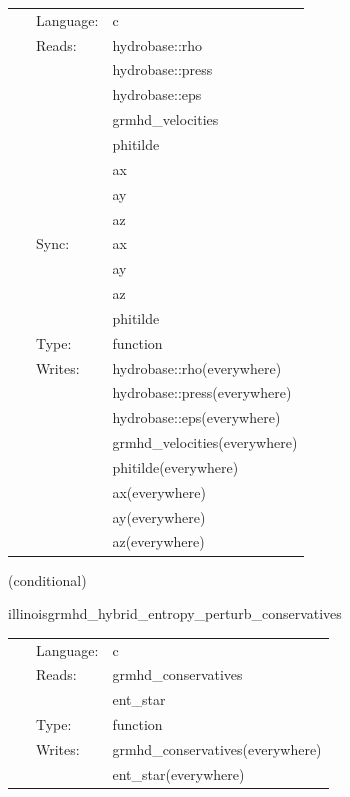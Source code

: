  \begin{tabular*}{160mm}{cll} 
~ & Language:  & c \\ 
~ & Reads:  & hydrobase::rho \\ 
~& ~ &hydrobase::press\\ 
~& ~ &hydrobase::eps\\ 
~& ~ &grmhd\_velocities\\ 
~& ~ &phitilde\\ 
~& ~ &ax\\ 
~& ~ &ay\\ 
~& ~ &az\\ 
~ & Sync:  & ax \\ 
~& ~ &ay\\ 
~& ~ &az\\ 
~& ~ &phitilde\\ 
~ & Type:  & function \\ 
~ & Writes:  & hydrobase::rho(everywhere) \\ 
~& ~ &hydrobase::press(everywhere)\\ 
~& ~ &hydrobase::eps(everywhere)\\ 
~& ~ &grmhd\_velocities(everywhere)\\ 
~& ~ &phitilde(everywhere)\\ 
~& ~ &ax(everywhere)\\ 
~& ~ &ay(everywhere)\\ 
~& ~ &az(everywhere)\\ 
\end{tabular*} 


\vspace{5mm}

   (conditional) 

\hspace{5mm} illinoisgrmhd\_hybrid\_entropy\_perturb\_conservatives 

\hspace{5mm}{\it entropy+hybrid version of illinoisgrmhd\_perturb\_conservatives } 


\hspace{5mm}

 \begin{tabular*}{160mm}{cll} 
~ & Language:  & c \\ 
~ & Reads:  & grmhd\_conservatives \\ 
~& ~ &ent\_star\\ 
~ & Type:  & function \\ 
~ & Writes:  & grmhd\_conservatives(everywhere) \\ 
~& ~ &ent\_star(everywhere)\\ 
\end{tabular*} 


